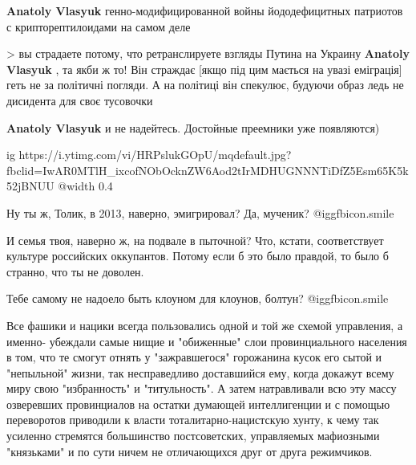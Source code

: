 \begin{itemize}
\begin{itemize}
\textbf{Anatoly Vlasyuk} генно-модифицированной войны йододефицитных патриотов с крипторептилоидами на самом деле


> вы страдаете потому, что ретранслируете взгляды Путина на Украину
\textbf{Anatoly Vlasyuk} , та якби ж то! Він страждає [якщо під цим мається на увазі еміграція] геть не за політичні погляди. А на політиці він спекулює, будуючи образ ледь не дисидента для своє тусовочки

\textbf{Anatoly Vlasyuk} и не надейтесь. Достойные преемники уже появляются)

\ifcmt
  ig https://i.ytimg.com/vi/HRPslukGOpU/mqdefault.jpg?fbclid=IwAR0MTlH_ixcofNObOcknZW6Aod2tIrMDHUGNNNTiDfZ5Esm65K5k52jBNUU
  @width 0.4
\fi

\end{itemize} %


Ну ты ж, Толик, в 2013, наверно, эмигрировал? Да, мученик?  @igg{fbicon.smile} 

И семья твоя, наверно ж, на подвале в пыточной? Что, кстати, соответствует
культуре российских оккупантов. Потому если б это было правдой, то было б
странно, что ты не доволен.

Тебе самому не надоело быть клоуном для клоунов, болтун?  @igg{fbicon.smile} 


Все фашики и нацики всегда пользовались одной и той же схемой управления, а
именно- убеждали самые нищие и "обиженные" слои провинциального населения в
том, что те смогут отнять у "зажравшегося" горожанина кусок его сытой и
"непыльной" жизни, так несправедливо доставшийся ему, когда докажут всему миру
свою "избранность" и "титульность". А затем натравливали всю эту массу
озверевших провинциалов на остатки думающей интеллигенции и с помощью
переворотов приводили к власти тоталитарно-нацистскую хунту, к чему так
усиленно стремятся большинство постсоветских, управляемых мафиозными
"князьками" и по сути ничем не отличающихся друг от друга режимчиков.

\end{itemize} %
